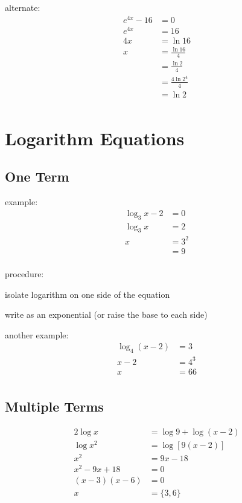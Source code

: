 \documentclass{exam}
\begin{document}
  alternate:
  \begin{align*}
    e^{4x} - 16 &= 0 \\
    e^{4x}      &= 16 \\
    4x          &= \ln 16 \\
    x           &= \frac{\ln 16}{4} \\
                &= \frac{\ln 2}{4} \\
                &= \frac{4 \ln 2^4}{4} \\
                &= \ln 2 \\
  \end{align*}

  \section{Logarithm Equations}

  \subsection{One Term}

  example:
  \begin{align*}
    \log_3 x - 2 &= 0 \\
    \log_3 x     &= 2 \\
    x            &= 3^2 \\
                 &= 9 \\
  \end{align*}

  procedure:
  \begin{itemize*}
    \item isolate logarithm on one side of the equation
    \item write as an exponential (or raise the base to each side)
  \end{itemize*}
  
  another example:
  \begin{align*}
    \log_4 (x - 2) &= 3 \\
    x - 2        &= 4^3 \\
    x            &= 66 \\
  \end{align*}

  \subsection{Multiple Terms}

  \begin{align*}
    2 \log x       &= \log 9 + \log(x - 2) \\
    \log x^2       &= \log [9(x - 2)] \\
    x^2            &= 9x - 18 \\
    x^2 - 9x + 18  &= 0 \\
    (x - 3)(x - 6) &= 0 \\
    x              &= \{ 3, 6 \} \\
  \end{align*}
\end{document}
